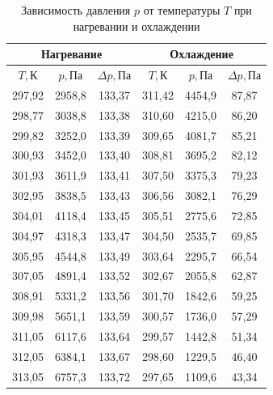 \documentclass[a4paper,12pt]{article}
\theoremstyle{plain} %
\theoremstyle{definition} %
\theoremstyle{remark} %
\begin{document}
	\renewcommand{\arraystretch}{1} %
	\renewcommand{\tabcolsep}{2ex}   %
	\begin{table}[H]
		\begin{center}
		\begin{tabular}{|c|c|c||c|c|c|}
			\hline
			\multicolumn{3}{|c||}{Нагревание}  & \multicolumn{3}{|c|}{Охлаждение}     \\ \hline
			$T, \text{К}$      & $p, \text{Па}$      & $\Delta p, \text{Па}$      & $T, \text{К}$      & $p, \text{Па}$      & $\Delta p, \text{Па}$     \\ \hline
			297,92 & 2958,8 & 133,37 & 311,42 & 4454,9 & 87,87 \\ \hline
			298,77 & 3038,8 & 133,38 & 310,60 & 4215,0 & 86,20 \\ \hline
			299,82 & 3252,0 & 133,39 & 309,65 & 4081,7 & 85,21 \\ \hline
			300,93 & 3452,0 & 133,40 & 308,81 & 3695,2 & 82,12 \\ \hline
			301,93 & 3611,9 & 133,41 & 307,50 & 3375,3 & 79,23 \\ \hline
			302,95 & 3838,5 & 133,43 & 306,56 & 3082,1 & 76,29 \\ \hline
			304,01 & 4118,4 & 133,45 & 305,51 & 2775,6 & 72,85 \\ \hline
			304,97 & 4318,3 & 133,47 & 304,50 & 2535,7 & 69,85 \\ \hline
			305,95 & 4544,8 & 133,49 & 303,64 & 2295,7 & 66,54 \\ \hline
			307,05 & 4891,4 & 133,52 & 302,67 & 2055,8 & 62,87 \\ \hline
			308,91 & 5331,2 & 133,56 & 301,70 & 1842,6 & 59,25 \\ \hline
			309,98 & 5651,1 & 133,59 & 300,57 & 1736,0 & 57,29 \\ \hline
			311,05 & 6117,6 & 133,64 & 299,57 & 1442,8 & 51,34 \\ \hline
			312,05 & 6384,1 & 133,67 & 298,60 & 1229,5 & 46,40 \\ \hline
			313,05 & 6757,3 & 133,72 & 297,65 & 1109,6 & 43,34 \\ \hline
		\end{tabular}
	\captionsetup{justification=centering}
	\caption{Зависимость давления $p$ от температуры $T$ при нагревании и охлаждении}
	\end{center}
	\end{table}
	\renewcommand{\tabcolsep}{1.5ex}
\end{document}
